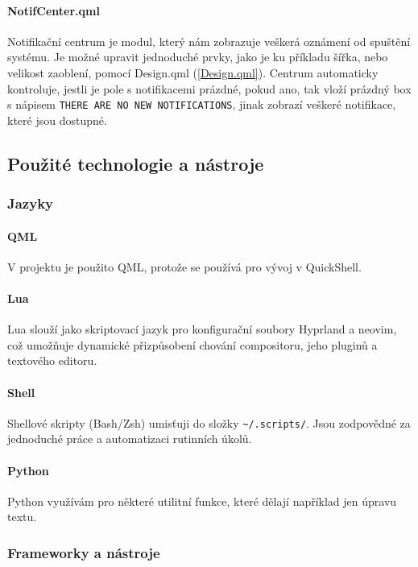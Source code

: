 \documentclass[12pt,a4paper]{article}
\begin{document}
\paragraph{NotifCenter.qml}
\label{NotifCenter.qml}
Notifikační centrum je modul, který nám zobrazuje veškerá oznámení od spuštění systému. Je možné upravit jednoduché prvky,
jako je ku příkladu šířka, nebo velikost zaoblení, pomocí Design.qml (\ref{Design.qml}). Centrum automaticky kontroluje, jestli
je pole s notifikacemi prázdné, pokud ano, tak vloží prázdný box s nápisem \verb|THERE ARE NO NEW NOTIFICATIONS|, jinak 
zobrazí veškeré notifikace, které jsou dostupné.


\subsection{Použité technologie a nástroje}

\subsubsection{Jazyky}
\paragraph{QML}
V projektu je použito QML, protože se používá pro vývoj v QuickShell. \autocite{QtDocumentation}

\paragraph{Lua}
Lua slouží jako skriptovací jazyk pro konfigurační soubory Hyprland a neovim, což umožňuje dynamické přizpůsobení 
chování compositoru, jeho pluginů a textového editoru.

\paragraph{Shell}
Shellové skripty (Bash/Zsh) umisťuji do složky \texttt{\textasciitilde/.scripts/}. Jsou zodpovědné za jednoduché
práce a automatizaci rutinních úkolů. 

\paragraph{Python}
Python využívám pro některé utilitní funkce, které dělají například jen úpravu textu.

\subsubsection{Frameworky a nástroje}
\end{document}
